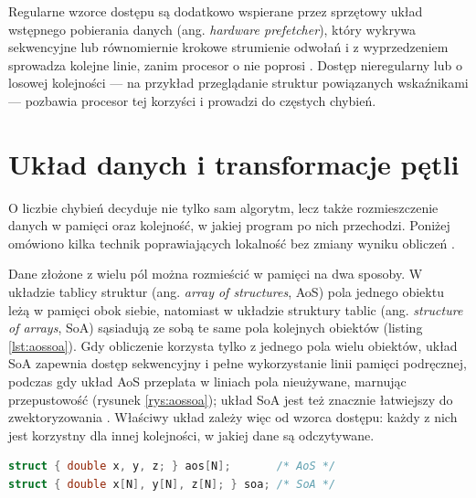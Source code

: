 \documentclass[a4paper,12pt]{book} %
\begin{document}
Regularne wzorce dostępu są dodatkowo wspierane przez sprzętowy układ wstępnego pobierania danych (ang. \emph{hardware prefetcher}), który wykrywa sekwencyjne lub równomiernie krokowe strumienie odwołań i z wyprzedzeniem sprowadza kolejne linie, zanim procesor o nie poprosi \cite{drepper2007memory}. Dostęp nieregularny lub o losowej kolejności --- na przykład przeglądanie struktur powiązanych wskaźnikami --- pozbawia procesor tej korzyści i prowadzi do częstych chybień.

\section{Układ danych i transformacje pętli}
\label{sec:uklad}

O liczbie chybień decyduje nie tylko sam algorytm, lecz także rozmieszczenie danych w pamięci oraz kolejność, w jakiej program po nich przechodzi. Poniżej omówiono kilka technik poprawiających lokalność bez zmiany wyniku obliczeń \cite{drepper2007memory}.

Dane złożone z wielu pól można rozmieścić w pamięci na dwa sposoby. W układzie tablicy struktur (ang. \emph{array of structures}, AoS) pola jednego obiektu leżą w pamięci obok siebie, natomiast w układzie struktury tablic (ang. \emph{structure of arrays}, SoA) sąsiadują ze sobą te same pola kolejnych obiektów (listing \ref{lst:aossoa}). Gdy obliczenie korzysta tylko z jednego pola wielu obiektów, układ SoA zapewnia dostęp sekwencyjny i pełne wykorzystanie linii pamięci podręcznej, podczas gdy układ AoS przeplata w liniach pola nieużywane, marnując przepustowość (rysunek \ref{rys:aossoa}); układ SoA jest też znacznie łatwiejszy do zwektoryzowania \cite{intel_sdlt}. Właściwy układ zależy więc od wzorca dostępu: każdy z nich jest korzystny dla innej kolejności, w jakiej dane są odczytywane.

\begin{lstfloat}[t!]
\begin{lstlisting}[language=C, caption={Dwa układy danych złożonych: tablica struktur (AoS) oraz struktura tablic (SoA)}, label={lst:aossoa}]
struct { double x, y, z; } aos[N];       /* AoS */
struct { double x[N], y[N], z[N]; } soa; /* SoA */
\end{lstlisting}
\end{lstfloat}
\end{document}
